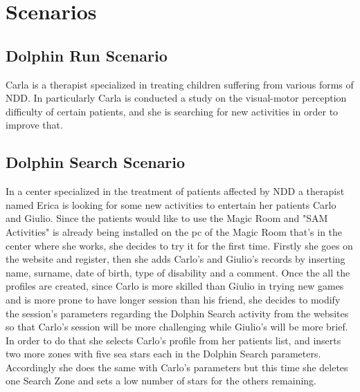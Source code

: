 \section{Scenarios}
\subsection{Dolphin Run Scenario}
Carla is a therapist specialized in treating children suffering from various forms of NDD. In particularly Carla is conducted a study on the visual-motor perception difficulty of certain patients, and she is searching for new activities in order to improve that. \newline
\subsection{Dolphin Search Scenario}
In a center specialized in the treatment of patients affected by NDD a therapist named Erica is looking for some new activities to entertain her patients Carlo and Giulio.
Since the patients would like to use the Magic Room and "SAM Activities" is already being installed on the pc of the Magic Room that's in the center where she works, she decides to try it for the first time.
Firstly she goes on the website and register, then she adds Carlo's and Giulio's records by inserting name, surname, date of birth, type of disability and a comment.
Once the all the profiles are created, since Carlo is more skilled than Giulio in trying new games and is more prone to have longer session than his friend, she decides to modify the session's parameters regarding the Dolphin Search activity from the websites so that Carlo's session will be more challenging while Giulio's will be more brief. In order to do that she selects Carlo's profile from her patients list, and inserts two more zones with five sea stars each in the Dolphin Search parameters. Accordingly she does the same with Carlo's parameters but this time she deletes one Search Zone and sets a low number of stars for the others remaining.